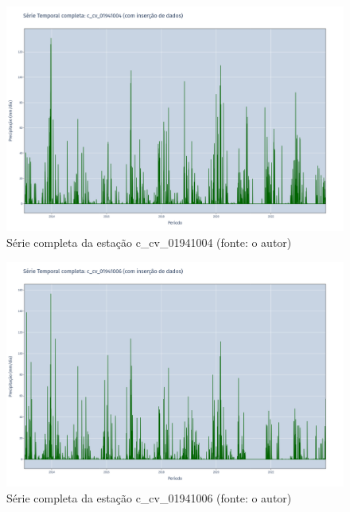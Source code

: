 \begin{figure}[!h]
\centering
\includegraphics[scale=0.25]{Figuras/rio_doce/rioDoceSerie_c_cv_01941004_completa.png}
\caption{Série completa da estação c\_cv\_01941004 (fonte: o autor)}
\label{fig:rioDoceSerie_c_cv_01941004_completa}
\end{figure}

\begin{figure}[!h]
\centering
\includegraphics[scale=0.25]{Figuras/rio_doce/rioDoceSerie_c_cv_01941006_completa.png}
\caption{Série completa da estação c\_cv\_01941006 (fonte: o autor)}
\label{fig:rioDoceSerie_c_cv_01941006_completa}
\end{figure}

